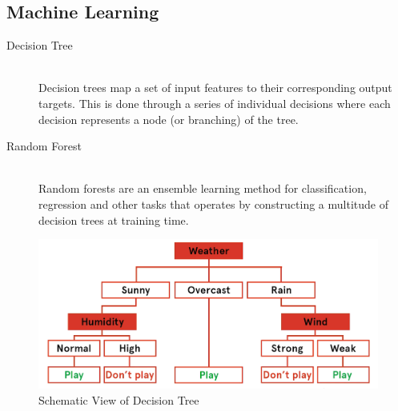\documentclass{beamer}
\begin{document}
\subsection{Machine Learning}
\begin{frame}
    \begin{description}
        \item[Decision Tree] \hfill \\ Decision trees map a set of input features to their corresponding output targets. This is done through a series of individual decisions where each decision represents a node (or branching) of the tree. 
        \\[0.2in]
        \pause
        \item[Random Forest] \hfill \\ Random forests are an ensemble learning method for classification, regression and other tasks that operates by constructing a multitude of decision trees at training time. 
    \end{description}
    \end{frame}
\begin{frame}
    \begin{figure}
        \includegraphics[scale=0.15]{img/decision_tree2.png}
        \caption*{Schematic View of Decision Tree}
    \end{figure}
    \end{frame}
\end{document}
